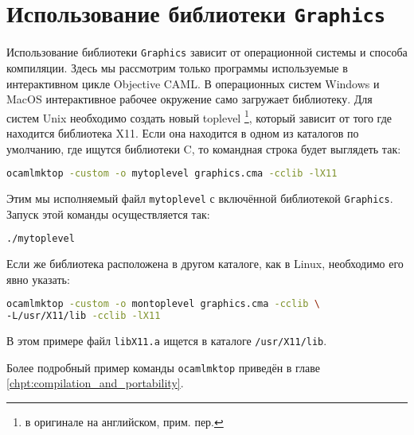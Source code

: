\section{Использование библиотеки \texttt{Graphics}}
\label{sec:using_the_graphics_module}

Использование библиотеки \texttt{Graphics} зависит от операционной системы и 
способа компиляции. Здесь мы рассмотрим только программы используемые в 
интерактивном цикле Objective CAML. В операционных систем Windows и MacOS 
интерактивное рабочее окружение само загружает библиотеку. Для систем Unix 
необходимо создать новый toplevel \footnote{в оригинале на английском, прим. 
пер.}, который зависит от того где находится библиотека X11. Если она находится 
в одном из каталогов по умолчанию, где ищутся библиотеки C, то командная строка 
будет выглядеть так:

\begin{lstlisting}[language=Bash]
ocamlmktop -custom -o mytoplevel graphics.cma -cclib -lX11
\end{lstlisting}

Этим мы исполняемый файл \texttt{mytoplevel} с включённой библиотекой 
\texttt{Graphics}. Запуск этой команды осуществляется так:

\begin{lstlisting}[language=Bash]
./mytoplevel
\end{lstlisting}

Если же библиотека расположена в другом каталоге, как в Linux, необходимо его
явно указать:

\begin{lstlisting}[language=Bash]
ocamlmktop -custom -o montoplevel graphics.cma -cclib \
-L/usr/X11/lib -cclib -lX11
\end{lstlisting}

В этом примере файл \texttt{libX11.a} ищется в каталоге \texttt{/usr/X11/lib}.

Более подробный пример команды \texttt{ocamlmktop} приведён в главе 
\ref{chpt:compilation_and_portability}.